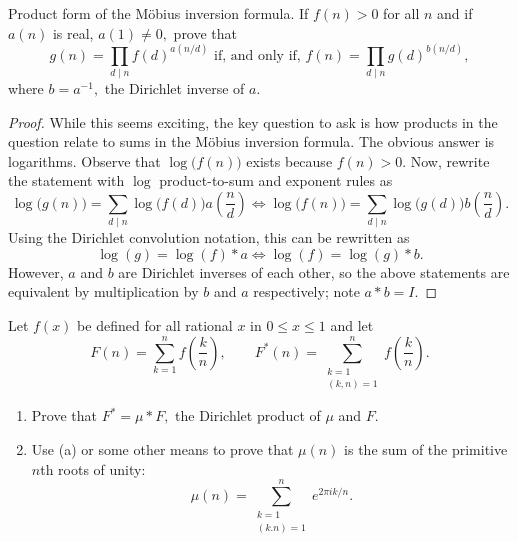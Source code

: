 \begin{exercise}
Product form of the M\"obius inversion formula. If $f(n)>0$ for all $n$ and if $a(n)$ is real, $a(1)\ne0,$ prove that
\[g(n)=\prod_{d\mid n}f(d)^{a(n/d)}\text{ if, and only if, }f(n)=\prod_{d\mid n}g(d)^{b(n/d)},\]
where $b=a^{-1},$ the Dirichlet inverse of $a.$
\end{exercise}

\begin{proof}
While this seems exciting, the key question to ask is how products in the question relate to sums in the M\"obius inversion formula. The obvious answer is logarithms. Observe that $\log\big(f(n)\big)$ exists because $f(n)>0.$ Now, rewrite the statement with $\log$ product-to-sum and exponent rules as
\[\log\big(g(n)\big)=\sum_{d\mid n}\log\big(f(d)\big)a\left(\frac nd\right)\iff \log\big(f(n)\big)=\sum_{d\mid n}\log\big(g(d)\big)b\left(\frac nd\right).\]
Using the Dirichlet convolution notation, this can be rewritten as
\[\log(g)=\log(f)*a\iff\log(f)=\log(g)*b.\]
However, $a$ and $b$ are Dirichlet inverses of each other, so the above statements are equivalent by multiplication by $b$ and $a$ respectively; note $a*b=I.$
\end{proof}

\begin{exercise}
Let $f(x)$ be defined for all rational $x$ in $0\le x\le1$ and let
\[F(n)=\sum_{k=1}^nf\left(\frac kn\right),\qquad F^*(n)=\sum_{\substack{k=1\\(k,n)=1}}^nf\left(\frac kn\right).\]
\begin{enumerate}[label=(\alph*)]
    \item Prove that $F^*=\mu*F,$ the Dirichlet product of $\mu$ and $F.$
    \item Use (a) or some other means to prove that $\mu(n)$ is the sum of the primitive $n$th roots of unity:
    \[\mu(n)=\sum_{\substack{k=1\\(k.n)=1}}^ne^{2\pi ik/n}.\]
\end{enumerate}
\end{exercise}

